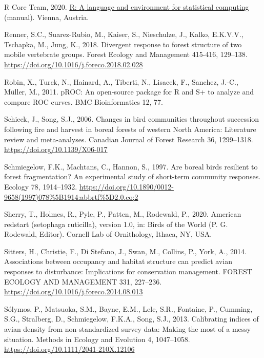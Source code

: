 \documentclass[
  12pt,
]{article}
\newlength{\cslhangindent}
\newlength{\cslentryspacingunit} %
\newenvironment{CSLReferences}[2] %
 {%
  \setlength{\parindent}{0pt}
  \ifodd #1
  \let\oldpar\par
  \def\par{\hangindent=\cslhangindent\oldpar}
  \fi
  \setlength{\parskip}{#2\cslentryspacingunit}
 }%
 {}
\begin{document}
\begin{CSLReferences}{1}{0}
\leavevmode{}%
R Core Team, 2020. \href{https://www.R-project.org/}{R: {A} language and environment for statistical computing} (manual). Vienna, Austria.

\leavevmode{}%
Renner, S.C., Suarez-Rubio, M., Kaiser, S., Nieschulze, J., Kalko, E.K.V.V., Tschapka, M., Jung, K., 2018. Divergent response to forest structure of two mobile vertebrate groups. Forest Ecology and Management 415-416, 129--138. \url{https://doi.org/10.1016/j.foreco.2018.02.028}

\leavevmode{}%
Robin, X., Turck, N., Hainard, A., Tiberti, N., Lisacek, F., Sanchez, J.-C., Müller, M., 2011. {pROC}: An open-source package for {R} and {S}+ to analyze and compare {ROC} curves. BMC Bioinformatics 12, 77.

\leavevmode{}%
Schieck, J., Song, S.J., 2006. Changes in bird communities throughout succession following fire and harvest in boreal forests of western {North} {America}: {Literature} review and meta-analyses. Canadian Journal of Forest Research 36, 1299--1318. \url{https://doi.org/10.1139/X06-017}

\leavevmode{}%
Schmiegelow, F.K., Machtans, C., Hannon, S., 1997. Are boreal birds resilient to forest fragmentation? {An} experimental study of short-term community responses. Ecology 78, 1914--1932. \url{https://doi.org/10.1890/0012-9658(1997)078\%5B1914:abbrtf\%5D2.0.co;2}

\leavevmode{}%
Sherry, T., Holmes, R., Pyle, P., Patten, M., Rodewald, P., 2020. American redstart (setophaga ruticilla), version 1.0, in: Birds of the {World} ({P}. {G}. {Rodewald}, {Editor}). Cornell Lab of Ornithology, Ithaca, NY, USA.

\leavevmode{}%
Sitters, H., Christie, F., Di Stefano, J., Swan, M., Collins, P., York, A., 2014. Associations between occupancy and habitat structure can predict avian responses to disturbance: {Implications} for conservation management. FOREST ECOLOGY AND MANAGEMENT 331, 227--236. \url{https://doi.org/10.1016/j.foreco.2014.08.013}

\leavevmode{}%
Sólymos, P., Matsuoka, S.M., Bayne, E.M., Lele, S.R., Fontaine, P., Cumming, S.G., Stralberg, D., Schmiegelow, F.K.A., Song, S.J., 2013. Calibrating indices of avian density from non-standardized survey data: {Making} the most of a messy situation. Methods in Ecology and Evolution 4, 1047--1058. \url{https://doi.org/10.1111/2041-210X.12106}


\end{CSLReferences}
\end{document}
